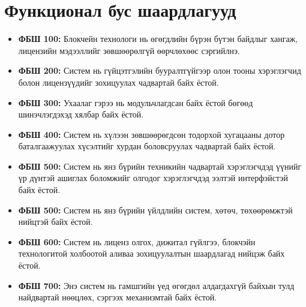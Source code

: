 \section{Функционал бус шаардлагууд}
\begin{itemize}
   \item \textbf{ФБШ 100:} Блокчейн технологи нь өгөгдлийн бүрэн бүтэн байдлыг хангаж, лицензийн мэдээллийг зөвшөөрөлгүй өөрчлөхөөс сэргийлнэ.
      \item \textbf{ФБШ 200:} Систем нь гүйцэтгэлийн бууралтгүйгээр олон тооны хэрэглэгчид болон лицензүүдийг зохицуулах чадвартай байх ёстой.
      \item \textbf{ФБШ 300:} Ухаалаг гэрээ нь модульчлагдсан байх ёстой бөгөөд шинэчлэгдэхэд хялбар байх ёстой.
      \item \textbf{ФБШ 400:} Систем нь хүлээн зөвшөөрөгдсөн тодорхой хугацааны дотор баталгаажуулах хүсэлтийг хурдан боловсруулах чадвартай байх ёстой.
      \item \textbf{ФБШ 500:} Систем нь янз бүрийн техникийн чадвартай хэрэглэгчдэд үүнийг үр дүнтэй ашиглах боломжийг олгодог хэрэглэгчдэд ээлтэй интерфэйстэй байх ёстой.
      \item \textbf{ФБШ 500:} Систем нь янз бүрийн үйлдлийн систем, хөтөч, төхөөрөмжтэй нийцтэй байх ёстой.
      \item \textbf{ФБШ 600:} Систем нь лиценз олгох, дижитал гүйлгээ, блокчэйн технологитой холбоотой аливаа зохицуулалтын шаардлагад нийцэж байх ёстой.
      \item \textbf{ФБШ 700:} Энэ систем нь гамшгийн үед өгөгдөл алдагдахгүй байхын тулд найдвартай нөөцлөх, сэргээх механизмтай байх ёстой.
\end{itemize}

\newpage
